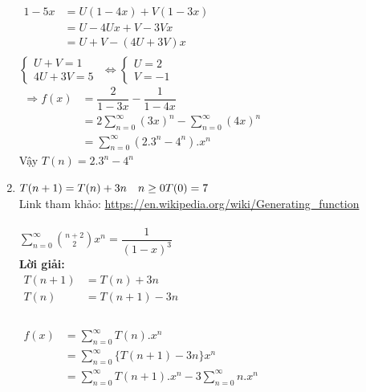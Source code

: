 \documentclass[12pt, letterpaper]{article}
\begin{document}
\begin{enumerate}
     \\
    $\begin{aligned}
        1-5x &= U(1-4x) + V(1-3x)\\
            &= U - 4Ux + V - 3Vx\\
            &= U + V - (4U + 3V)x\\
    \end{aligned}$\\
    $\begin{cases}
        U + V = 1\\
        4U + 3V = 5
    \end{cases}$
    $\Leftrightarrow \begin{cases}
        U = 2\\
        V = -1
    \end{cases}$\\

    $\begin{aligned}
        \Rightarrow f(x) &= \dfrac{2}{1-3x} - \dfrac{1}{1-4x}\\
                        &= 2\sum_{n = 0}^{\infty} (3x)^n - \sum_{n = 0}^{\infty} (4x)^n\\
                        &= \sum_{n=0}^{\infty} (2.3^n-4^n).x^n
    \end{aligned}$\\
    Vậy $T(n)=2.3^n-4^n$\\
    \item
    $T(n+1) = T(n) + 3n \quad n \geq 0 \\
    T(0) = 7$\\
    Link tham khảo: \url{https://en.wikipedia.org/wiki/Generating_function}\\

     \\
    $\sum_{n=0}^{\infty}\binom{n+2}{2} x^n = \dfrac{1}{(1-x)^3}$\\

    \textbf{Lời giải:} \\
    $\begin{aligned}
        T(n+1) &= T(n) + 3n\\
        T(n) &= T(n+1) - 3n\\
    \end{aligned}$\\
     \\
    $\begin{aligned}
        f(x) &= \sum_{n = 0}^{\infty}T(n).x^n \\
            &= \sum_{n = 0}^{\infty} \{ T(n+1)-3n \}x^n\\
            &= \sum_{n = 0}^{\infty}T(n+1).x^n - 3\sum_{n = 0}^{\infty}n.x^n \\
    \end{aligned} $ \\


\end{enumerate}
\end{document}
